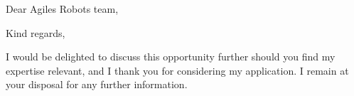 \documentclass[10pt,a4paper]{moderncv}
\begin{document}
\date{\today}

\opening{Dear Agiles Robots team,}
\closing{Kind regards,}

\makeletterhead

\justifying
\vspace{.5em}
\par 
\vspace{.5em}
\par I would be delighted to discuss this opportunity further should you find my expertise relevant, and I thank you for considering my application. I remain at your disposal for any further information.

\makeletterclosing
\end{document}
